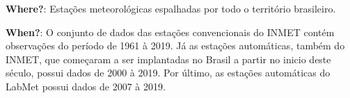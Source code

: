 \textbf{Where?}: Estações meteorológicas espalhadas por todo o território brasileiro.  

\textbf{When?}: O conjunto de dados das estações convencionais do INMET contém observações do período de 1961 à 2019. Já as estações automáticas, também do INMET, que começaram a ser implantadas no Brasil a partir no inicio deste século, possui dados de 2000 à 2019. Por último, as estações automáticas do LabMet possui dados de 2007 à 2019. 

\renewcommand{\cleardoublepage}{}
\renewcommand{\clearpage}{}
\vspace{5mm}